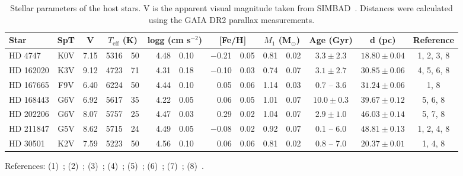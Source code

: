
\begin{table*}
    \centering
    \begin{threeparttable}[b]
        \caption[Stellar parameters of host stars.]{Stellar parameters of the host stars.
            V is the apparent visual magnitude taken from {SIMBAD}~\citep{wenger_simbad_2000}.
            Distances were calculated using the GAIA DR2 parallax measurements.}
        \begin{tabular}{l c c r@{$~\pm~$}l r@{$~\pm~$}l r@{$~\pm~$}l r@{$~\pm~$}l c c c}
            \toprule
            Star & SpT & V & \multicolumn{2}{c}{\(T_{\textrm{eff}}\) (K)} & \multicolumn{2}{c}{logg (cm s\(^{-2} \))} & \multicolumn{2}{c}{[Fe/H]} & \multicolumn{2}{c}{\(M_1\) (\textrm{M}\(_{\odot} \))} & Age (Gyr) & d (pc) & Reference\\
            \midrule
            {HD 4747} & K0V & 7.15 & 5316 & 50 & 4.48 & 0.10 & $-$0.21 & 0.05 & 0.81 & 0.02 & $3.3 \pm 2.3$ & $18.80 \pm 0.04$ & 1, 2, 3, 8 \\
            {HD 162020} & K3V & 9.12 & 4723 & 71 & 4.31 & 0.18 & $-$0.10 & 0.03 & 0.74 & 0.07 & $3.1 \pm 2.7$ & $30.85 \pm 0.06$ & 4, 5, 6, 8 \\
            {HD 167665} & F9V & 6.40 & 6224 & 50 & 4.44 & 0.10 & 0.05 & 0.06 & 1.14 & 0.03 & 0.7 -- 3.6 & $ 31.24 \pm 0.06$ & 1, 8 \\
            {HD 168443} & G6V & 6.92 & 5617 & 35 & 4.22 & 0.05 & 0.06 & 0.05 & 1.01 & 0.07 & $10.0 \pm 0.3$ & $39.67 \pm 0.12$ & 5, 6, 8 \\
            {HD 202206} & G6V & 8.07 & 5757 & 25 & 4.47 & 0.03 & 0.29 & 0.02 & 1.04 & 0.07 & $2.9 \pm 1.0$ & $46.03 \pm 0.14$ & 5, 7, 8 \\
            {HD 211847} & G5V & 8.62 & 5715 & 24 & 4.49 & 0.05 & $-$0.08 & 0.02 & 0.92 & 0.07 & 0.1 -- 6.0 & $48.81 \pm 0.13 $ & 1, 2, 4, 8 \\
            {HD 30501} & K2V & 7.59 & 5223 & 50 & 4.56 & 0.10 & 0.06 & 0.06 & 0.81 & 0.02 & 0.8 -- 7.0 & $20.37 \pm 0.01$ & 1, 4, 8 \\
            \bottomrule
        \end{tabular} \label{tab:star_params}
        \begin{tablenotes}
           \item[] References: (1)~\citet{sahlmann_search_2011}; (2)~\citet{santos_spectroscopic_2005}; (3)~\citet{crepp_trends_2016}; (4)~\citet{tsantaki_deriving_2013}; (5)~\cite{bonfanti_age_2016}; (6)~\citet{santos_spectroscopic_2004}; (7)~\citet{sousa_spectroscopic_2008}; (8)~\citet{collaboration_gaia_2018}.
        \end{tablenotes}
    \end{threeparttable}
\end{table*}
